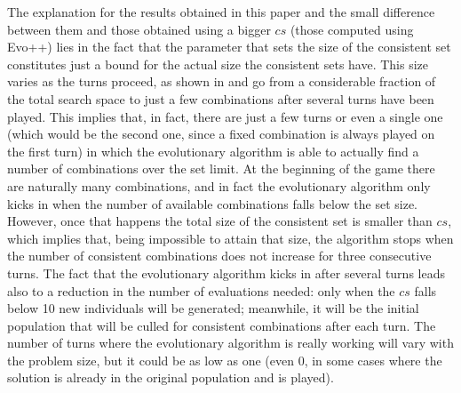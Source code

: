 \documentclass[conference]{IEEEtran}
\begin{document}
The explanation for the results obtained in this paper and the small
difference between them and those obtained using a bigger $cs$  (those
computed using Evo++) lies in the fact that the
parameter that sets the size of the consistent set  constitutes just a bound for the actual size the
consistent sets have. This size varies as the turns proceed, as shown in
\cite{DBLP:journals/corr/abs-1207-1315} and go from a considerable
fraction of the total search space to just a few combinations after
several turns have been played. This implies that, in fact, there are
just a few turns or even a single one (which would be the second one, since a fixed
combination is always played on the first turn) in which the evolutionary
algorithm is able to actually find  a number of combinations over the
set limit. At the beginning of the game there are naturally many
combinations, and in fact the evolutionary algorithm only kicks in
when the number of available combinations falls below the set
size. However, once that happens the total size of the consistent set
is smaller than $cs$, which implies that, being impossible to
attain that size, the algorithm stops when the number of consistent
combinations does not increase for three consecutive turns. The fact that the
evolutionary algorithm kicks in after several turns leads also to a
reduction in the number of evaluations needed: only when the
$cs$ falls below 10 new individuals will be generated;
meanwhile, it will be the initial population that will be culled for
consistent combinations after each turn. The number of turns where the
evolutionary algorithm is really working will vary with the problem
size, but it could be as low as one (even 0, in some cases where the
solution is already in the original population and is played). 
\end{document}
